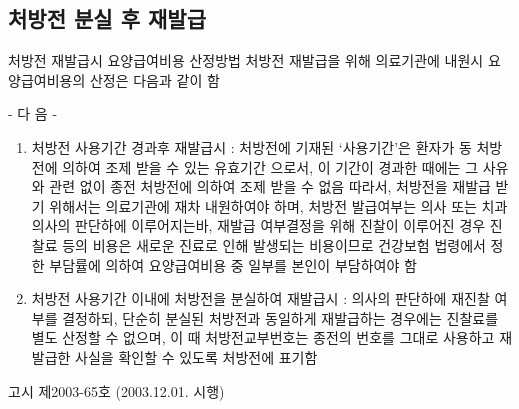 \subsection{처방전 분실 후 재발급}

\begin{commentbox}{처방전 재발급시 요양급여비용 산정방법}
처방전 재발급을 위해 의료기관에 내원시 요양급여비용의 산정은 다음과 같이 함\par
- 다 음 -
\begin{enumerate}[가.]\tightlist
\item 처방전 사용기간 경과후 재발급시
: 처방전에 기재된 ‘사용기간’은 환자가 동 처방전에 의하여 조제 받을 수 있는 유효기간 으로서, 이 기간이 경과한 때에는 그 사유와 관련 없이 종전 처방전에 의하여 조제 받을 수 없음 따라서, 처방전을 재발급 받기 위해서는 의료기관에 재차 내원하여야 하며, 처방전 발급여부는 의사 또는 치과의사의 판단하에 이루어지는바, 재발급 여부결정을 위해 진찰이 이루어진 경우 진찰료 등의 비용은 새로운 진료로 인해 발생되는 비용이므로 건강보험 법령에서 정한 부담률에 의하여 요양급여비용 중 일부를 본인이 부담하여야 함
\item 처방전 사용기간 이내에 처방전을 분실하여 재발급시
: 의사의 판단하에 재진찰 여부를 결정하되, 단순히 분실된 처방전과 동일하게 재발급하는 경우에는 진찰료를 별도 산정할 수 없으며, 이 때 처방전교부번호는 종전의 번호를 그대로 사용하고 재발급한 사실을 확인할 수 있도록 처방전에 표기함
\end{enumerate}
고시 제2003-65호 (2003.12.01. 시행)
\end{commentbox}